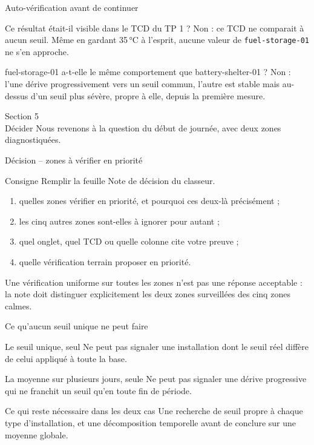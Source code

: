 \documentclass[aspectratio=169]{beamer}
\begin{document}
\begin{frame}{Auto-vérification avant de continuer}
  \small
  \begin{block}{Ce résultat était-il visible dans le TCD du TP 1 ?}
    Non : ce TCD ne comparait à aucun seuil. Même en gardant 35\,°C à l'esprit, aucune valeur de \texttt{fuel-storage-01} ne s'en approche.
  \end{block}
  \begin{block}{fuel-storage-01 a-t-elle le même comportement que battery-shelter-01 ?}
    Non : l'une dérive progressivement vers un seuil commun, l'autre est stable mais au-dessus d'un seuil plus sévère, propre à elle, depuis la première mesure.
  \end{block}
\end{frame}

\begin{frame}[plain]
  \centering
  \Huge Section 5\\[3mm]
  \Large Décider
  \vfill
  \normalsize Nous revenons à la question du début de journée, avec deux zones diagnostiquées.
\end{frame}

\begin{frame}{Décision -- zones à vérifier en priorité}
  \begin{block}{Consigne}
    Remplir la feuille Note de décision du classeur.
  \end{block}
  \begin{enumerate}
    \item quelles zones vérifier en priorité, et pourquoi ces deux-là précisément ;
    \item les cinq autres zones sont-elles à ignorer pour autant ;
    \item quel onglet, quel TCD ou quelle colonne cite votre preuve ;
    \item quelle vérification terrain proposer en priorité.
  \end{enumerate}
  \alert{Une vérification uniforme sur toutes les zones n'est pas une réponse acceptable : la note doit distinguer explicitement les deux zones surveillées des cinq zones calmes.}
\end{frame}

\begin{frame}{Ce qu'aucun seuil unique ne peut faire}
  \begin{block}{Le seuil unique, seul}
    Ne peut pas signaler une installation dont le seuil réel diffère de celui appliqué à toute la base.
  \end{block}
  \begin{block}{La moyenne sur plusieurs jours, seule}
    Ne peut pas signaler une dérive progressive qui ne franchit un seuil qu'en toute fin de période.
  \end{block}
  \begin{alertblock}{Ce qui reste nécessaire dans les deux cas}
    Une recherche de seuil propre à chaque type d'installation, et une décomposition temporelle avant de conclure sur une moyenne globale.
  \end{alertblock}
\end{frame}
\end{document}
